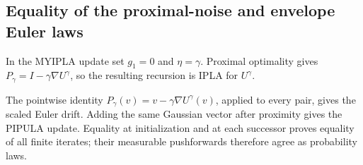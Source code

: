 \documentclass[11pt,a4paper]{report}
\begin{document}
\subsection{\texorpdfstring{Equality of the proximal-noise and envelope Euler laws}{Equality of the proximal-noise and envelope Euler laws}}
\label{report-step-ProximalLangevin-PIPULA-lean-2}


In the MYIPLA update set \(g_1=0\) and \(\eta=\gamma\). Proximal optimality gives \(P_\gamma=I-\gamma\nabla U^\gamma\), so the resulting recursion is IPLA for \(U^\gamma\).



The pointwise identity \(P_\gamma(v)=v-\gamma\nabla U^\gamma(v)\), applied to every pair, gives the scaled Euler drift. Adding the same Gaussian vector after proximity gives the PIPULA update. Equality at initialization and at each successor proves equality of all finite iterates; their measurable pushforwards therefore agree as probability laws.
\end{document}
